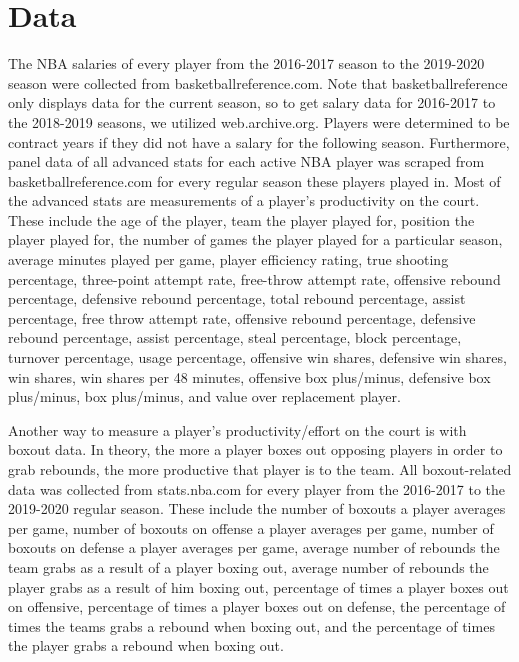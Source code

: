 \documentclass[12pt]{article}
\begin{document}
	\section{Data} \label{sec:data}

	The NBA salaries of every player from the 2016-2017 season to the 2019-2020 season were collected from basketballreference.com. Note that basketballreference only displays data for the current season, so to get salary data for 2016-2017 to the 2018-2019 seasons, we utilized web.archive.org. Players were determined to be contract years if they did not have a salary for the following season. Furthermore, panel data of all advanced stats for each active NBA player was scraped from basketballreference.com for every regular season these players played in. Most of the advanced stats are measurements of a player's productivity on the court. These include the age of the player, team the player played for, position the player played for, the number of games the player played for a particular season, average minutes played per game, player efficiency rating, true shooting percentage, three-point attempt rate, free-throw attempt rate, offensive rebound percentage, defensive rebound percentage, total rebound percentage, assist percentage, free throw attempt rate, offensive rebound percentage, defensive rebound percentage, assist percentage, steal percentage, block percentage, turnover percentage, usage percentage, offensive win shares, defensive win shares, win shares, win shares per 48 minutes, offensive box plus/minus, defensive box plus/minus, box plus/minus, and value over replacement player. 

	Another way to measure a player's productivity/effort on the court is with boxout data. In theory, the more a player boxes out opposing players in order to grab rebounds, the more productive that player is to the team. All boxout-related data was collected from stats.nba.com for every player from the 2016-2017 to the 2019-2020 regular season. These include the number of boxouts a player averages per game, number of boxouts on offense a player averages per game, number of boxouts on defense a player averages per game, average number of rebounds the team grabs as a result of a player boxing out, average number of rebounds the player grabs as a result of him boxing out, percentage of times a player boxes out on offensive, percentage of times a player boxes out on defense, the percentage of times the teams grabs a rebound when boxing out, and the percentage of times the player grabs a rebound when boxing out. 
\end{document}
